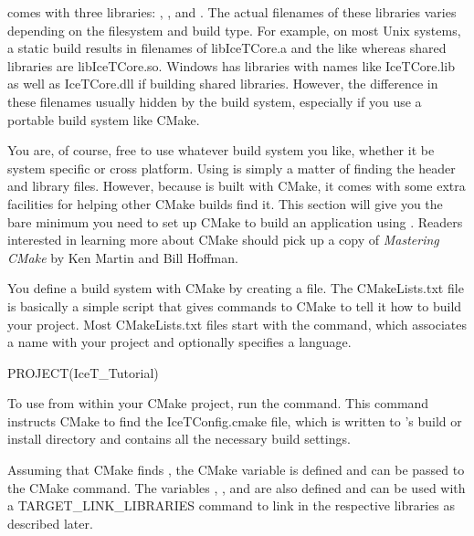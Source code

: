 \IceT comes with three libraries:
,
, and
.  The actual filenames of these
libraries varies depending on the filesystem and build type.  For example,
on most Unix systems, a static build results in filenames of
libIceTCore.a and the like whereas shared libraries
are libIceTCore.so.  Windows has libraries with names
like IceTCore.lib as well as
IceTCore.dll if building shared libraries.  However,
the difference in these filenames usually hidden by the build system,
especially if you use a portable build system like CMake.

You are, of course, free to use whatever build system you like, whether it
be system specific or cross platform.  Using \IceT is simply a matter of
finding the header and library files.  However, because \IceT is built with
CMake, it comes with some extra facilities for helping other
CMake builds find it.  This section will give you the bare minimum you need
to set up CMake to build an application using \IceT.  Readers interested in
learning more about CMake should pick up a copy of \emph{Mastering CMake}
by Ken Martin and Bill Hoffman.

You define a build system with CMake by creating a
 file.  The CMakeLists.txt
file is basically a simple script that gives commands to CMake to tell it
how to build your project.  Most CMakeLists.txt files start with the
 command, which associates a name with your project and
optionally specifies a language.
\begin{code}
PROJECT(IceT_Tutorial)
\end{code}

To use \IceT from within your CMake project, run the
 command.  This command instructs
CMake to find the IceTConfig.cmake file, which is
written to \IceT's build or install directory and contains all the
necessary build settings.

Assuming that CMake finds \IceT, the CMake variable
 is defined and can be passed to the
 CMake command.
The variables , , and
 are also defined and can be used with a
TARGET\_LINK\_LIBRARIES command to link in
the respective \IceT libraries as described later.

